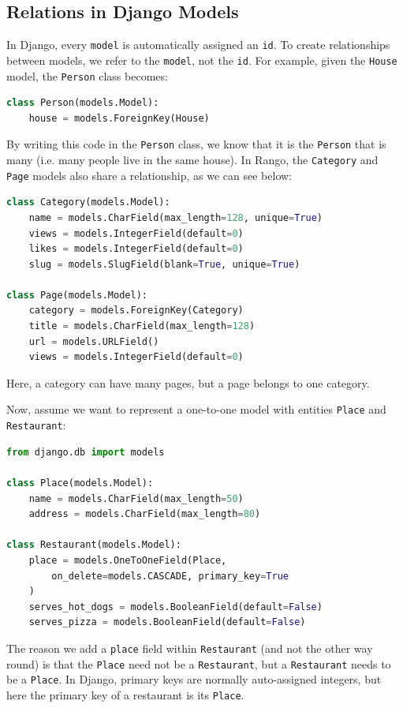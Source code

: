 \documentclass[a4paper, openany]{memoir}
\begin{document}
\subsection{Relations in Django Models}
In Django, every \texttt{model} is automatically assigned an \texttt{id}. To create relationships between models, we refer to the \texttt{model}, not the \texttt{id}. For example, given the \texttt{House} model, the \texttt{Person} class becomes:
\begin{lstlisting}[language=python]
class Person(models.Model):
    house = models.ForeignKey(House)
\end{lstlisting}
By writing this code in the \texttt{Person} class, we know that it is the \texttt{Person} that is many (i.e. many people live in the same house). In Rango, the \texttt{Category} and \texttt{Page} models also share a relationship, as we can see below:
\begin{lstlisting}[language=python]
class Category(models.Model):
    name = models.CharField(max_length=128, unique=True)
    views = models.IntegerField(default=0)
    likes = models.IntegerField(default=0)
    slug = models.SlugField(blank=True, unique=True)

class Page(models.Model):
    category = models.ForeignKey(Category)
    title = models.CharField(max_length=128)
    url = models.URLField()
    views = models.IntegerField(default=0)
\end{lstlisting}
Here, a category can have many pages, but a page belongs to one category.

Now, assume we want to represent a one-to-one model with entities \texttt{Place} and \texttt{Restaurant}:
\begin{lstlisting}[language=python]
from django.db import models

class Place(models.Model):
    name = models.CharField(max_length=50)
    address = models.CharField(max_length=80)

class Restaurant(models.Model):
    place = models.OneToOneField(Place,
        on_delete=models.CASCADE, primary_key=True
    )
    serves_hot_dogs = models.BooleanField(default=False)
    serves_pizza = models.BooleanField(default=False) 
\end{lstlisting}
The reason we add a \texttt{place} field within \texttt{Restaurant} (and not the other way round) is that the \texttt{Place} need not be a \texttt{Restaurant}, but a \texttt{Restaurant} needs to be a \texttt{Place}. In Django, primary keys are normally auto-assigned integers, but here the primary key of a restaurant is its \texttt{Place}.
\end{document}
